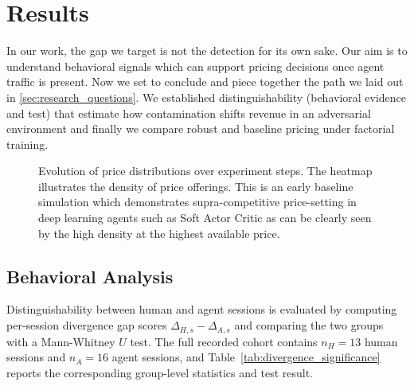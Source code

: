\section{Results}
\label{sec:results}


In our work, the gap we target is not the detection for its own sake. Our aim is to understand behavioral signals which can support pricing decisions once agent traffic is present. Now we set to conclude and piece together the path we laid out in \cref{sec:research_questions}. We established distinguishability (behavioral evidence and test) that estimate how contamination shifts revenue in an adversarial environment and finally we compare robust and baseline pricing under factorial training.

\begin{figure}[ht]
    \centering
    
    \caption{Evolution of price distributions over experiment steps. The heatmap illustrates the density of price offerings. This is an early baseline simulation which demonstrates supra-competitive price-setting in deep learning agents such as Soft Actor Critic as can be clearly seen by the high density at the highest available price.}
    \label{fig:supra_heatmap}
\end{figure}



\subsection{Behavioral Analysis}

Distinguishability between human and agent sessions is evaluated by computing per-session divergence gap scores $\Delta_{H,s} - \Delta_{A,s}$ and comparing the two groups with a Mann-Whitney $U$ test. The full recorded cohort contains $n_H=13$ human sessions and $n_A=16$ agent sessions, and Table~\ref{tab:divergence_significance} reports the corresponding group-level statistics and test result.

